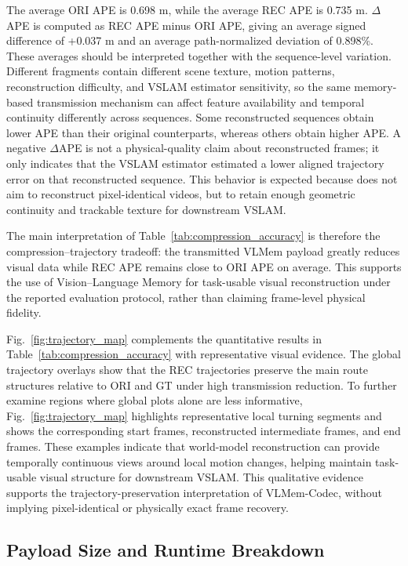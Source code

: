 The average ORI APE is 0.698 m, while the average REC APE is 0.735 m. \(\Delta\)APE is computed as REC APE minus ORI APE, giving an average signed difference of +0.037 m and an average path-normalized deviation of 0.898\%. These averages should be interpreted together with the sequence-level variation. Different fragments contain different scene texture, motion patterns, reconstruction difficulty, and VSLAM estimator sensitivity, so the same memory-based transmission mechanism can affect feature availability and temporal continuity differently across sequences. Some reconstructed sequences obtain lower APE than their original counterparts, whereas others obtain higher APE. A negative \(\Delta\)APE is not a physical-quality claim about reconstructed frames; it only indicates that the VSLAM estimator estimated a lower aligned trajectory error on that reconstructed sequence. This behavior is expected because \VLMemCodec{} does not aim to reconstruct pixel-identical videos, but to retain enough geometric continuity and trackable texture for downstream VSLAM.

The main interpretation of Table~\ref{tab:compression_accuracy} is therefore the compression--trajectory tradeoff: the transmitted VLMem payload greatly reduces visual data while REC APE remains close to ORI APE on average. This supports the use of Vision--Language Memory for task-usable visual reconstruction under the reported evaluation protocol, rather than claiming frame-level physical fidelity.

Fig.~\ref{fig:trajectory_map} complements the quantitative results in Table~\ref{tab:compression_accuracy} with representative visual evidence. The global trajectory overlays show that the REC trajectories preserve the main route structures relative to ORI and GT under high transmission reduction. To further examine regions where global plots alone are less informative, Fig.~\ref{fig:trajectory_map} highlights representative local turning segments and shows the corresponding start frames, reconstructed intermediate frames, and end frames. These examples indicate that world-model reconstruction can provide temporally continuous views around local motion changes, helping maintain task-usable visual structure for downstream VSLAM. This qualitative evidence supports the trajectory-preservation interpretation of VLMem-Codec, without implying pixel-identical or physically exact frame recovery.

\subsection{Payload Size and Runtime Breakdown}
\label{subsec:payload_runtime}

